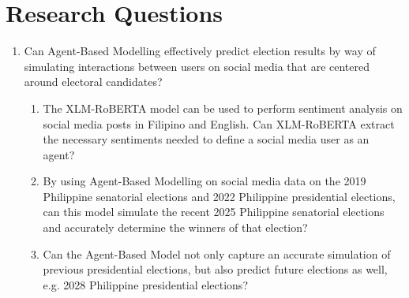 \section{Research Questions}

\begin{enumerate}
    \item Can Agent-Based Modelling effectively predict election results by way of simulating interactions between users on social media that are centered around electoral candidates? 
    \begin{enumerate}
        \item The XLM-RoBERTA model can be used to perform sentiment analysis on social media posts in Filipino and English. Can XLM-RoBERTA extract the necessary sentiments needed to define a social media user as an agent?
        \item By using Agent-Based Modelling on social media data on the 2019 Philippine senatorial elections and 2022 Philippine presidential elections, can this model simulate the recent 2025 Philippine senatorial elections and accurately determine the winners of that election?
        \item Can the Agent-Based Model not only capture an accurate simulation of previous presidential elections, but also predict future elections as well, e.g. 2028 Philippine presidential elections?
    \end{enumerate}
\end{enumerate}